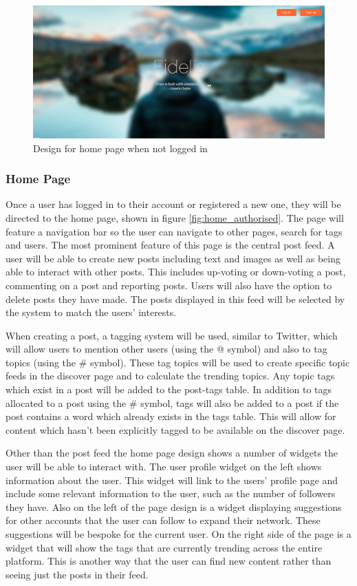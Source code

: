 \begin{figure}[H]
\centering
\includegraphics[width=\linewidth]{Images/Design/home_unauthorised}
\caption{Design for home page when not logged in}
\label{fig:home_unauthorised}
\end{figure}

\subsubsection{Home Page}
Once a user has logged in to their account or registered a new one, they will be directed to the home page, shown in figure \ref{fig:home_authorised}. The page will feature a navigation bar so the user can navigate to other pages, search for tags and users. The most prominent feature of this page is the central post feed. A user will be able to create new posts including text and images as well as being able to interact with other posts. This includes up-voting or down-voting a post, commenting on a post and reporting posts. Users will also have the option to delete posts they have made. The posts displayed in this feed will be selected by the system to match the users' interests.

When creating a post, a tagging system will be used, similar to Twitter, which will allow users to mention other users (using the @ symbol) and also to tag topics (using the \# symbol). These tag topics will be used to create specific topic feeds in the discover page and to calculate the trending topics. Any topic tags which exist in a post will be added to the post-tags table. In addition to tags allocated to a post using the \# symbol, tags will also be added to a post if the post contains a word which already exists in the tags table. This will allow for content which hasn't been explicitly tagged to be available on the discover page.

Other than the post feed the home page design shows a number of widgets the user will be able to interact with. The user profile widget on the left shows information about the user. This widget will link to the users' profile page and include some relevant information to the user, such as the number of followers they have. Also on the left of the page design is a widget displaying suggestions for other accounts that the user can follow to expand their network. These suggestions will be bespoke for the current user. On the right side of the page is a widget that will show the tags that are currently trending across the entire platform. This is another way that the user can find new content rather than seeing just the posts in their feed.

